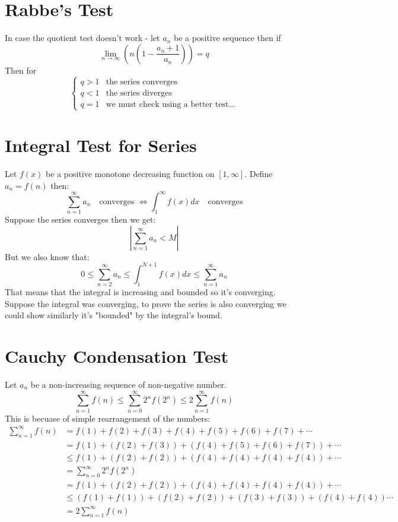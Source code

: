 \documentclass[11pt,a4paper]{article}
\theoremstyle{definition}
\theoremstyle{plain}
\begin{document}
	\section{Rabbe's Test}
	In case the quotient test doesn't work - let $a_n$ be a positive sequence then if
	\[
	\lim_{n\to\infty}{\left(n\left(1-\frac{a_n+1}{a_n}\right)\right)} = q
	\]
	Then for
	\[
	\begin{cases}
		q > 1 & \text{the series converges} \\
		q < 1 & \text{the series diverges} \\
		q = 1 & \text{we must check using a better test...}
	\end{cases}
	\]
	
	\newpage
	
	\section{Integral Test for Series}
	Let $f(x)$ be a positive monotone decreasing function on $[1,\infty]$. 
	Define $a_n = f(n)$ then:
	\[
	\sum_{n=1}^{\infty}{a_n} \quad \text{converges } \iff 
	\int_{1}^{\infty}{f(x)dx} \quad\text{converges}
	\]
	Suppose the series converges then we get:
	\[
		\left| \sum_{n=1}^{\infty}{a_n} < M \right|
	\]
	But we also know that:
	\[
	0 \le \sum_{n=2}^{\infty}{a_n} \le 
	\int_{1}^{N+1}f(x)dx \le \sum_{n=1}^{\infty}{a_n}
	\]
	That means that the integral is increasing and bounded so it's converging. 
	Suppose the integral was converging, to prove the series is also converging 
	we could show similarly it's "bounded" by the integral's bound.
	
	\newpage
	
	\section{Cauchy Condensation Test}
	Let $a_n$ be a non-increasing sequence of non-negative number.
	\[
		\sum_{n=1}^\infty {f(n)} \le 
		\sum_{n=0}^\infty{2^nf(2^n)}\le 2\sum_{n=1}^\infty {f(n)}
	\]
	This is becuase of simple rearrangement of the numbers:
	\begin{align*}
		\sum_{n=1}^\infty{f(n)} 
		& = f(1) +  f(2) + f(3)  +  f(4) + f(5) + f(6) + f(7)  +\cdots \\
 		& = f(1) + (f(2) + f(3)) + (f(4) + f(5) + f(6) + f(7)) +\cdots \\
 	   &\le f(1) + (f(2) + f(2)) + (f(4) + f(4) + f(4) + f(4)) +\cdots  \\
 		& =  \sum_{n=0}^\infty{2^nf(2^n)} \\
 		& = f(1) + (f(2) + f(2)) + (f(4) + f(4) + f(4) + f(4)) +\cdots \\
 		& \le  (f(1)+f(1))+(f(2)+f(2))+(f(3)+f(3))+(f(4)+f(4)) \cdots \\
 		& = 2\sum_{n=1}^\infty {f(n)}
	\end{align*}
	
\end{document}
